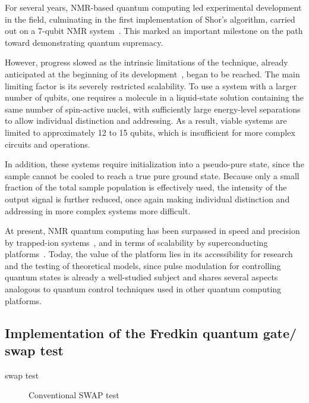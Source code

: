 For several years, NMR-based quantum computing led experimental development in the field, culminating in the first implementation of Shor’s algorithm, carried out on a 7-qubit NMR system~\cite{Vandersypen2001ShorNMR}. This marked an important milestone on the path toward demonstrating quantum supremacy.

However, progress slowed as the intrinsic limitations of the technique, already anticipated at the beginning of its development~\cite{Warren1997Usefulness}, began to be reached. The main limiting factor is its severely restricted scalability. To use a system with a larger number of qubits, one requires a molecule in a liquid-state solution containing the same number of spin-active nuclei, with sufficiently large energy-level separations to allow individual distinction and addressing. As a result, viable systems are limited to approximately 12 to 15 qubits, which is insufficient for more complex circuits and operations.

In addition, these systems require initialization into a pseudo-pure state, since the sample cannot be cooled to reach a true pure ground state. Because only a small fraction of the total sample population is effectively used, the intensity of the output signal is further reduced, once again making individual distinction and addressing in more complex systems more difficult.

At present, NMR quantum computing has been surpassed in speed and precision by trapped-ion systems~\cite{Bermudez2017Trappedions, Schafer2018FastIons}, and in terms of scalability by superconducting platforms~\cite{Arute2019QuantumSupremacy, Castelvecchi2023IBM1000Qubit}. Today, the value of the platform lies in its accessibility for research and the testing of theoretical models, since pulse modulation for controlling quantum states is already a well-studied subject and shares several aspects analogous to quantum control techniques used in other quantum computing platforms.

\subsection{Implementation of the Fredkin quantum gate/ swap test}

swap test\cite{liu2022multistateswaptestalgorithm}

\begin{figure}[h]
\centering
{}
\caption{Conventional SWAP test}
\end{figure}

